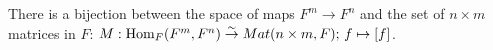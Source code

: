  There is a bijection between the space of maps $F^{m} \to F^{n}$ and the set of $n \times m$ matrices in $F$: $M : \text{Hom}_{F}(F^{m}, F^{n}) \stackrel{\sim}{\to} Mat(n \times m, F);\, f \mapsto [f]$.
